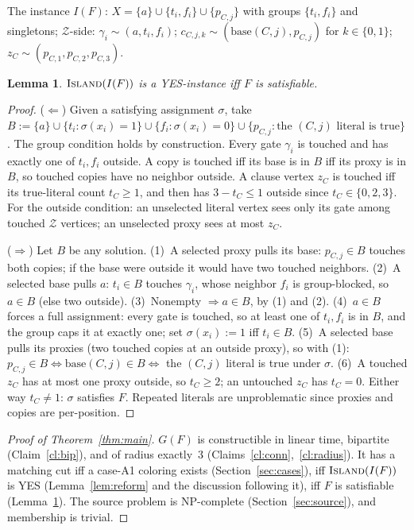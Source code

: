 \documentclass[11pt]{article}
\newtheorem{lemma}[theorem]{Lemma}
\begin{document}
The instance $I(F)$: $X = \{a\} \cup \{t_i, f_i\} \cup \{p_{C,j}\}$
with groups $\{t_i,f_i\}$ and singletons; $\mathcal{Z}$-side:
$\gamma_i \sim (a, t_i, f_i)$; $c_{C,j,k} \sim (\mathrm{base}(C,j),
p_{C,j})$ for $k \in \{0,1\}$; $z_C \sim (p_{C,1}, p_{C,2},
p_{C,3})$.

\begin{lemma}\label{lem:island}
$\textsc{Island}(I(F))$ is a YES-instance iff $F$ is satisfiable.
\end{lemma}

\begin{proof}
($\Leftarrow$) Given a satisfying assignment $\sigma$, take $B :=
\{a\} \cup \{t_i : \sigma(x_i) = 1\} \cup \{f_i : \sigma(x_i) = 0\}
\cup \{p_{C,j} : \text{the } (C,j) \text{ literal is true}\}$. The
group condition holds by construction. Every gate $\gamma_i$ is
touched and has exactly one of $t_i, f_i$ outside. A copy is touched
iff its base is in $B$ iff its proxy is in $B$, so touched copies
have no neighbor outside. A clause vertex $z_C$ is touched iff its
true-literal count $t_C \ge 1$, and then has $3 - t_C \le 1$ outside
since $t_C \in \{0,2,3\}$. For the outside condition: an unselected
literal vertex sees only its gate among touched $\mathcal{Z}$
vertices; an unselected proxy sees at most $z_C$.

($\Rightarrow$) Let $B$ be any solution. (1)~A selected proxy pulls
its base: $p_{C,j} \in B$ touches both copies; if the base were
outside it would have two touched neighbors. (2)~A selected base
pulls $a$: $t_i \in B$ touches $\gamma_i$, whose neighbor $f_i$ is
group-blocked, so $a \in B$ (else two outside). (3)~Nonempty $\Rightarrow
a \in B$, by (1) and (2). (4)~$a \in B$ forces a full assignment:
every gate is touched, so at least one of $t_i, f_i$ is in $B$, and
the group caps it at exactly one; set $\sigma(x_i) := 1$ iff $t_i \in
B$. (5)~A selected base pulls its proxies (two touched copies at an
outside proxy), so with (1): $p_{C,j} \in B \iff \mathrm{base}(C,j)
\in B \iff$ the $(C,j)$ literal is true under $\sigma$. (6)~A touched
$z_C$ has at most one proxy outside, so $t_C \ge 2$; an untouched
$z_C$ has $t_C = 0$. Either way $t_C \ne 1$: $\sigma$ satisfies $F$.
Repeated literals are unproblematic since proxies and copies are
per-position.
\end{proof}

\begin{proof}[Proof of Theorem~\ref{thm:main}]
$G(F)$ is constructible in linear time, bipartite
(Claim~\ref{cl:bip}), and of radius exactly~3
(Claims~\ref{cl:conn},~\ref{cl:radius}). It has a matching cut iff a
case-A1 coloring exists (Section~\ref{sec:cases}), iff
$\textsc{Island}(I(F))$ is YES (Lemma~\ref{lem:reform} and the
discussion following it), iff $F$ is satisfiable
(Lemma~\ref{lem:island}). The source problem is NP-complete
(Section~\ref{sec:source}), and membership is trivial.
\end{proof}
\end{document}

